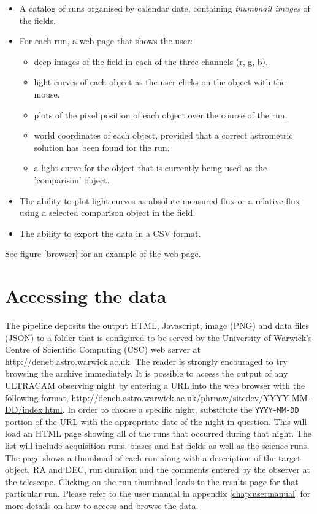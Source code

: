 \begin{itemize}
	\item A catalog of runs organised by calendar date, containing \emph{thumbnail images} of the fields.
	\item For each run, a web page that shows the user:
	\begin{itemize}
		\item deep images of the field in each of the three channels (r, g, b).
		\item light-curves of each object as the user clicks on the object with the mouse. 
		\item plots of the pixel position of each object over the course of the run.
		\item world coordinates of each object, provided that a correct astrometric solution has been found for the run. 
		\item a light-curve for the object that is currently being used as the 'comparison' object. 
	\end{itemize}
	\item The ability to plot light-curves as absolute measured flux or a relative flux using a selected comparison object in the field. 
	\item The ability to export the data in a CSV format.
	
\end{itemize}
See figure \ref{browser} for an example of the web-page. 


  
\section{Accessing the data}
The pipeline deposits the output HTML, Javascript, image (PNG) and data files (JSON) to a folder that is configured to be served by the University of Warwick's Centre of Scientific Computing (CSC) web server at \url{http://deneb.astro.warwick.ac.uk}. The reader is strongly encouraged to try browsing the archive immediately. It is possible to access the output of any ULTRACAM observing night by entering a URL into the web browser with the following format, \url{http://deneb.astro.warwick.ac.uk/phrnaw/sitedev/YYYY-MM-DD/index.html}. In order to choose a specific night, substitute the \texttt{YYYY-MM-DD} portion of the URL with the appropriate date of the night in question. This will load an HTML page showing all of the runs that occurred during that night. The list will include acquisition runs, biases and flat fields as well as the science runs. The page shows a thumbnail of each run along with a description of the target object, RA and DEC, run duration and the comments entered by the observer at the telescope. Clicking on the run thumbnail leads to the results page for that particular run. Please refer to the user manual in appendix \ref{chap:usermanual} for more details on how to access and browse the data.

